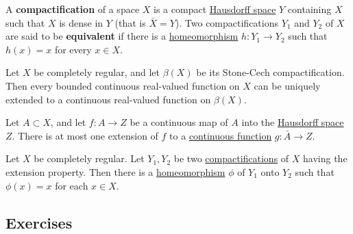   \begin{definition}[Compactification]
    \label{def:compactification-3}
    A \textbf{compactification} of a space $X$ is a compact \hyperref[def:hausdorff-space]{Hausdorff space} $Y$ containing $X$ such that $X$ is dense in $Y$ (that is $\bar{X} = Y$). Two compactifications $Y_1$ and $Y_2$ of $X$ are said to be \textbf{equivalent} if there is a \hyperref[def:homeomorphism]{homeomorphism} $h: Y_1 \to Y_2$ such that $h(x) = x$ for every $x \in X$. 
  \end{definition}

  \begin{theorem}
    \label{thm:universal-property-of-the-stone-cech}
    Let $X$ be completely regular, and let $\beta(X)$ be its Stone-Cech compactification. Then every bounded continuous real-valued function on $X$ can be uniquely extended to a continuous real-valued function on $\beta(X)$. 
  \end{theorem}

  \begin{lemma}
    \label{thm:extending-a-map-into-a-hausdorff-space}
    Let $A \subset X$, and let $f: A \to Z$ be a continuous map of $A$ into the \hyperref[def:hausdorff-space]{Hausdorff space} $Z$. There is at most one extension of $f$ to a \hyperref[def:continuous_func]{continuous function} $g: \bar{A} \to Z$. 
  \end{lemma}

  \begin{theorem}
    \label{thm:uniqueness-of-the-stone-cech-compactification}
    Let $X$ be completely regular. Let $Y_1, Y_2$ be two \hyperref[def:compactification-3]{compactifications} of $X$ having the extension property. Then there is a \hyperref[def:homeomorphism]{homeomorphism} $\phi$ of $Y_1$ onto $Y_2$ such that $\phi(x) = x$ for each $x \in X$. 
  \end{theorem}

\subsection{Exercises}

